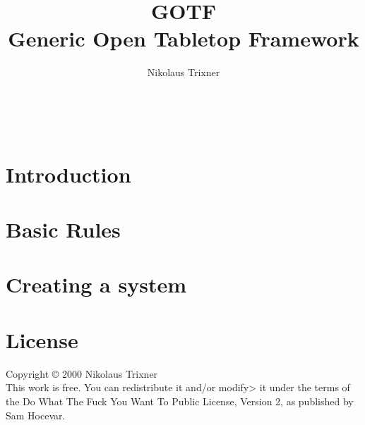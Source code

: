 \documentclass{article}
\begin{document}
	\title{GOTF \\ Generic Open Tabletop Framework}
	\
	\author{Nikolaus Trixner}
		
	\maketitle
	
	\tableofcontents

\part{Introduction}\label{part:intrudction}
	
	


\part{Basic Rules}\label{part:basicRules}
	

\part{Creating a system}\label{part:systemCreation}
	


\part{License}\label{part:license}
	Copyright © 2000 Nikolaus Trixner\\
	This work is free.
	You can redistribute it and/or modify> it under the  terms of the Do What The Fuck You Want To Public License, Version 2, as published by Sam Hocevar.
\end{document}
